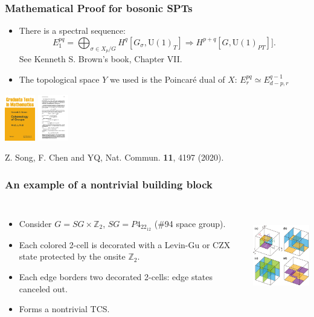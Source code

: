 \documentclass[xcolor=table, 11pt, aspectratio=169]{beamer}
\newcommand{\uone}{\mathrm U(1)}
\begin{document}
\begin{frame}
\frametitle{Mathematical Proof for bosonic SPTs}
\begin{itemize}
\item There is a spectral sequence:
\[E_1^{pq}=\bigoplus_{\sigma\in X_p/G}H^q[G_\sigma,\uone_T]\Rightarrow
 H^{p+q}[G, \uone_{PT}]].\]
See Kenneth S. Brown's book, Chapter VII.
\item The topological space $Y$ we used is the Poincar\'e dual of $X$: $E^{pq}_r\simeq E^{q-1}_{d-p,r}$ 
\end{itemize}
\begin{center}
	\includegraphics[height=2cm]{brown_book}
	\includegraphics[height=2cm]{brown_ss}
\end{center}
{\small Z. Song, F. Chen and YQ, Nat. Commun. \textbf{11}, 4197 (2020).}
\end{frame}

\begin{frame}
  \frametitle{An example of a nontrivial building block}
  \begin{columns}
    \begin{itemize}
      \item<1-> Consider $G=SG\times\mathbb Z_2$, $SG=P4_22_12$ (\#94 space group).
      \item<2-> Each colored 2-cell is decorated with a Levin-Gu or CZX state protected by the onsite $\mathbb Z_2$.
      \item<3-> Each edge borders two decorated 2-cells: edge states canceled out.
      \item<4-> Forms a nontrivial TCS.
    \end{itemize}
    \includegraphics[height=4cm]{blocks}
    \end{columns}
  \end{frame}
  
\end{document}
